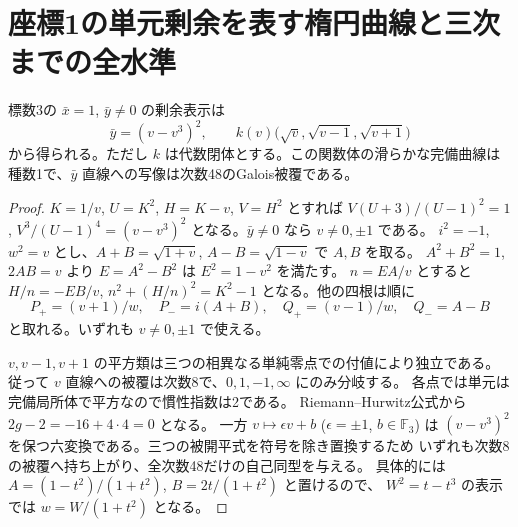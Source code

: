 \section{座標1の単元剰余を表す楕円曲線と三次までの全水準}
\label{sec:rank-fifteen-vertical-unit-levels}
\begin{lemma}\label{lem:rank-fifteen-vertical-elliptic-residues}
標数3の $\bar x=1$, $\bar y\ne0$ の剰余表示は
\[
 \bar y=(v-v^3)^2,\qquad
 k(v)\bigl(\sqrt v,\sqrt{v-1},\sqrt{v+1}\bigr)
\]
から得られる。ただし $k$ は代数閉体とする。この関数体の滑らかな完備曲線は
種数1で、$\bar y$ 直線への写像は次数48のGalois被覆である。
\end{lemma}
\begin{proof}
$K=1/v$, $U=K^2$, $H=K-v$, $V=H^2$ とすれば $V(U+3)/(U-1)^2=1$,
$V^3/(U-1)^4=(v-v^3)^2$ となる。$\bar y\ne0$ なら $v\ne0,\pm1$ である。
$i^2=-1$, $w^2=v$ とし、$A+B=\sqrt{1+v}$, $A-B=\sqrt{1-v}$ で $A,B$ を取る。
$A^2+B^2=1$, $2AB=v$ より $E=A^2-B^2$ は $E^2=1-v^2$ を満たす。
$n=EA/v$ とすると $H/n=-EB/v$,
$n^2+(H/n)^2=K^2-1$ となる。他の四根は順に
\[
 P_+=(v+1)/w,\quad P_-=i(A+B),\quad Q_+=(v-1)/w,\quad Q_-=A-B
\]
と取れる。いずれも $v\ne0,\pm1$ で使える。

$v,v-1,v+1$ の平方類は三つの相異なる単純零点での付値により独立である。
従って $v$ 直線への被覆は次数8で、$0,1,-1,\infty$ にのみ分岐する。
各点では単元は完備局所体で平方なので慣性指数は2である。
Riemann--Hurwitz公式から $2g-2=-16+4\cdot4=0$ となる。
一方 $v\mapsto\epsilon v+b$ ($\epsilon=\pm1$, $b\in\mathbb F_3$) は
$(v-v^3)^2$ を保つ六変換である。三つの被開平式を符号を除き置換するため
いずれも次数8の被覆へ持ち上がり、全次数48だけの自己同型を与える。
具体的には $A=(1-t^2)/(1+t^2)$, $B=2t/(1+t^2)$ と置けるので、
$W^2=t-t^3$ の表示では $w=W/(1+t^2)$ となる。
\end{proof}

